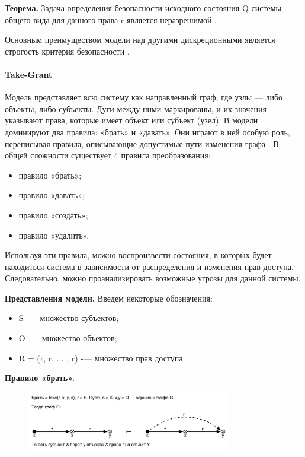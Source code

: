 \textbf{Теорема.} Задача определения безопасности исходного состояния Q системы общего вида для 
данного права r является неразрешимой \autocite{WikiHRU}.

Основным преимуществом модели над другими дискреционными является строгость критерия безопасности \autocite{WikiHRU}.

\paragraph{Take-Grant}

Модель представляет всю систему как направленный граф, где узлы — либо объекты, либо субъекты. Дуги между ними 
маркированы, и их значения указывают права, которые имеет объект или субъект (узел). В модели доминируют два правила: 
«брать» и «давать». Они играют в ней особую роль, переписывая правила, описывающие допустимые пути изменения графа \autocite{WikiTakeGrant}. 
В общей сложности существует 4 правила преобразования:
\begin{itemize}
    \item правило «брать»;
    \item правило «давать»;
    \item правило «создать»;
    \item правило «удалить».
\end{itemize}
Используя эти правила, можно воспроизвести состояния, в которых будет находиться система в зависимости от распределения 
и изменения прав доступа. Следовательно, можно проанализировать возможные угрозы для данной системы.

\textbf{Представления модели.} Введем некоторые обозначения:
\begin{itemize}
    \item S —- множество субъектов;
    \item O —- множество объектов;
    \item R = (r, r, ... , r) -— множество прав доступа.
\end{itemize}

\textbf{Правило «брать».}
\begin{figure}[H]
    \centering
    \includegraphics[width=0.8\textwidth]{assets/models/take_grant_bring.png}
\end{figure}


